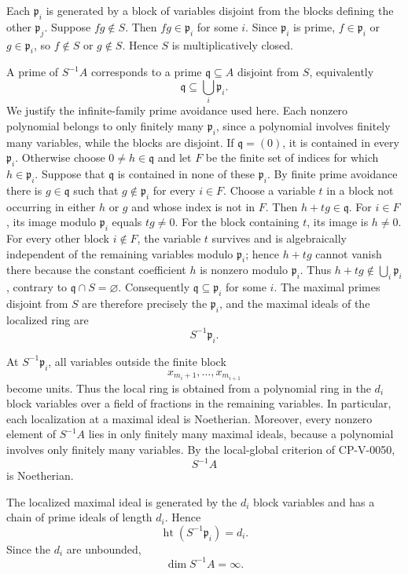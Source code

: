 \begin{solution}
Each \(\mathfrak p_i\) is generated by a block of variables disjoint from the
blocks defining the other \(\mathfrak p_j\). Suppose \(fg\notin S\). Then
\(fg\in\mathfrak p_i\) for some \(i\). Since \(\mathfrak p_i\) is prime,
\(f\in\mathfrak p_i\) or \(g\in\mathfrak p_i\), so \(f\notin S\) or
\(g\notin S\). Hence \(S\) is multiplicatively closed.

A prime of \(S^{-1}A\) corresponds to a prime \(\mathfrak q\subseteq A\)
disjoint from \(S\), equivalently
\[
\mathfrak q\subseteq\bigcup_i\mathfrak p_i.
\]
We justify the infinite-family prime avoidance used here. Each nonzero
polynomial belongs to only finitely many \(\mathfrak p_i\), since a
polynomial involves finitely many variables, while the blocks are disjoint.
If \(\mathfrak q=(0)\), it is contained in every \(\mathfrak p_i\).
Otherwise choose \(0\ne h\in\mathfrak q\) and let \(F\) be the finite
set of indices for which \(h\in\mathfrak p_i\). Suppose that
\(\mathfrak q\) is contained in none of these \(\mathfrak p_i\).
By finite prime avoidance there is \(g\in\mathfrak q\) such that
\(g\notin\mathfrak p_i\) for every \(i\in F\).
Choose a variable \(t\) in a block not occurring in either \(h\) or
\(g\) and whose index is not in \(F\). Then \(h+tg\in\mathfrak q\).
For \(i\in F\), its image modulo \(\mathfrak p_i\) equals
\(tg\ne0\). For the block containing \(t\), its image is \(h\ne0\).
For every other block \(i\notin F\), the variable \(t\) survives and is
algebraically independent of the remaining variables modulo
\(\mathfrak p_i\); hence \(h+tg\) cannot vanish there because the
constant coefficient \(h\) is nonzero modulo \(\mathfrak p_i\).
Thus \(h+tg\notin\bigcup_i\mathfrak p_i\), contrary to
\(\mathfrak q\cap S=\varnothing\). Consequently
\(\mathfrak q\subseteq\mathfrak p_i\) for some \(i\).
The maximal primes disjoint from \(S\) are therefore precisely the
\(\mathfrak p_i\), and the maximal ideals of the localized ring are
\[
S^{-1}\mathfrak p_i.
\]

At \(S^{-1}\mathfrak p_i\), all variables outside the finite block
\[
x_{m_i+1},\dots,x_{m_{i+1}}
\]
become units. Thus the local ring is obtained from a polynomial ring in the
\(d_i\) block variables over a field of fractions in the remaining
variables. In particular, each localization at a maximal ideal is
Noetherian. Moreover, every nonzero element of \(S^{-1}A\) lies in only
finitely many maximal ideals, because a polynomial involves only finitely
many variables. By the local-global criterion of CP-V-0050,
\[
S^{-1}A
\]
is Noetherian.

The localized maximal ideal is generated by the \(d_i\) block variables and
has a chain of prime ideals of length \(d_i\). Hence
\[
\operatorname{ht}(S^{-1}\mathfrak p_i)=d_i.
\]
Since the \(d_i\) are unbounded,
\[
\dim S^{-1}A=\infty.
\]
\end{solution}


